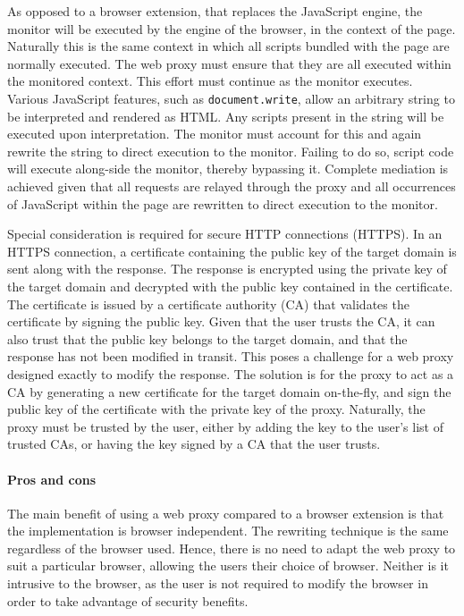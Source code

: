 \documentclass{llncs}
\newcommand{\todo}[1]{\colorbox{red}{\textcolor{white}{\sffamily\bfseries\scriptsize TODO}} \textcolor{red}{#1} \textcolor{red}{$\blacktriangleleft$}}
\begin{document}
As opposed to a browser extension, that replaces the 
JavaScript engine, the monitor will be executed by the engine of the browser, in the context of the page. Naturally 
this is the same context in which all scripts bundled with the 
page are normally executed. The web proxy must ensure that they are all executed within the 
monitored context. This effort must continue as the monitor executes. 
Various JavaScript features, such as 
\lstinline{document.write}, allow an arbitrary string to be 
interpreted and rendered as HTML. Any scripts present in the string will be 
executed upon interpretation. The monitor must account for this and again rewrite 
the string to direct execution to the monitor. Failing to do so, script code will execute 
along-side the monitor, thereby bypassing it. 
Complete mediation is achieved given that all requests are relayed through the proxy 
and all occurrences of JavaScript within the page are rewritten to direct execution to the monitor.

Special consideration is required for secure HTTP connections (HTTPS). In an HTTPS 
connection, a certificate containing the public key of the target domain is sent 
along with the response. The response is encrypted using the private key of the target 
domain and decrypted with the public key contained in the certificate. The 
certificate is issued by a certificate authority (CA)
that validates the certificate by signing the public key. Given that the user 
trusts the CA, it can also trust that the public key belongs 
to the target domain, and that the response has not been modified in transit.
This poses a challenge for a web proxy designed exactly to modify the response. The solution 
is for the proxy to act as a CA by generating a
new certificate for the target domain on-the-fly, and sign the 
public key of the certificate with the private key of the proxy. Naturally, 
the proxy must be trusted by the user, either by adding the key to 
the user's list of trusted CAs, or having the key signed by a CA that the user trusts.



\paragraph{Pros and cons}
The main benefit of using a web proxy 
compared to a browser extension is that the implementation is browser independent. The 
rewriting technique is the same regardless of the browser used. Hence, there is no 
need to adapt the web proxy to suit a particular browser, allowing 
the users their choice of browser.
Neither is it intrusive to the browser, as the user is not required to modify the 
browser in order to take advantage of security benefits. 
\end{document}
